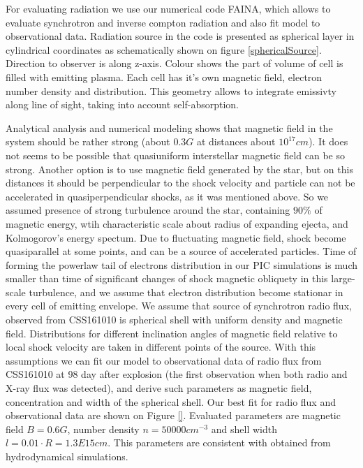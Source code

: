 \documentclass[a4paper,12pt]{extreport}
\begin{document}
For evaluating radiation we use our numerical code FAINA, which allows to evaluate synchrotron and inverse compton radiation and also fit model to observational data. Radiation source in the code is presented as spherical layer in cylindrical coordinates as schematically shown on figure \ref{sphericalSource}. Direction to observer is along z-axis. Colour shows the part of volume of cell is filled with emitting plasma. Each cell has it's own magnetic field, electron number density and distribution. This geometry allows to integrate emissivty along line of sight, taking into account self-absorption.

Analytical analysis \cite{Coppejans2020} and numerical modeling \cite{BykovUniverse} shows that magnetic field in the system should be rather strong (about $0.3 G$ at distances about $10^{17} cm$). It does not seems to be possible that quasiuniform interstellar magnetic field can be so strong. Another option is to use magnetic field generated by the star, but on this distances it should be perpendicular to the shock velocity \cite{Parker} and particle can not be accelerated in quasiperpendicular shocks, as it was mentioned above. So we assumed presence of strong turbulence around the star, containing $90 \%$ of magnetic energy, wtih characteristic scale about radius of expanding ejecta, and Kolmogorov's energy spectum. Due to fluctuating magnetic field, shock become quasiparallel at some points, and can be a source of accelerated particles. Time of forming the powerlaw tail of electrons distribution in our PIC simulations is much smaller than time of significant changes of shock magnetic obliquety in this large-scale turbulence, and we assume that electron distribution become stationar in every cell of emitting envelope.
We assume that source of synchrotron radio flux, observed from CSS161010 is spherical shell with uniform density and magnetic field.  Distributions for different inclination angles of magnetic field relative to local shock velocity are taken in different points of the source. With this assumptions we can fit our model to observational data of radio flux from CSS161010 at 98 day after explosion (the first observation when both radio and X-ray flux was detected), and derive such parameters as magnetic field, concentration and width of the spherical shell. Our best fit for radio flux and observational data are shown on Figure \ref{}. Evaluated parameters are magnetic field $B = 0.6 G$, number density $n = 50000{cm}^{-3}$ and shell width $l = 0.01\cdot R = 1.3E15 cm$. This parameters are consistent with obtained from hydrodynamical simulations.
\end{document}
